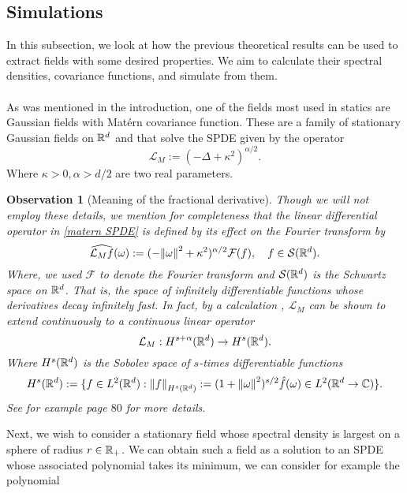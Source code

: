 \documentclass[12pt]{article}
\newtheorem{observation}{Observation}
\begin{document}
\subsection{Simulations}\label{simulations section}
In this subsection, we look at how the previous theoretical results can be used to extract fields with some desired properties. We aim to calculate their spectral densities, covariance functions, and simulate from them.\\
\\
As was mentioned in the introduction, one of the fields most used in statics are Gaussian fields with Matérn covariance function. These are a family of stationary Gaussian fields on ${\mathbb R}^d$ and that solve the SPDE given by the operator
\begin{equation}\label{matern SPDE}
	\mathcal{L}_M:=(-\Delta+\kappa^2)^{\alpha/2}.
\end{equation}
Where $\kappa>0,\alpha>d/2$ are two real parameters.
\begin{observation}[Meaning of the fractional derivative]
	Though we will not employ these details, we mention for completeness that the linear differential operator in \eqref{matern SPDE} is defined by its effect on the Fourier transform by
	\begin{equation*}
		\widehat{\mathcal{L}_Mf}(\omega):=(-\norm{\omega}^2+\kappa^2)^{\alpha/2}\mathcal{F}({f}),\quad f\in\mathcal{S}({\mathbb R}^d).
	\end{equation*}
	Where, we used $\mathcal{F}$ to denote the Fourier transform and $\mathcal{S}({\mathbb R}^d)$ is the Schwartz space on ${\mathbb R}^d$. That is, the space of infinitely differentiable functions whose derivatives decay infinitely fast. In fact, by a calculation , $\mathcal{L}_M$ can be shown to extend continuously to a continuous linear operator
	\begin{equation*}
		\mathcal{L}_M: H^{s+\alpha}({\mathbb R}^d)\to H^s({\mathbb R}^d).
	\end{equation*}
	Where $H^s({\mathbb R}^d)$ is the Sobolev space of $s$-times differentiable functions
	\begin{equation*}
		H^s({\mathbb R}^d):=\lbrace f\in L^2({\mathbb R}^d):\norm{f}_{ H^s({\mathbb R}^d)}:= (1+\norm{\omega}^2)^{s/2}\hat{f}(\omega)\in L^2({\mathbb R}^d\to\mathbb{C})\rbrace.
	\end{equation*}
	See for example \cite{lototsky2017stochastic} page $80$ for more details.
\end{observation}
Next, we wish to consider a stationary field whose spectral density is largest on a sphere of radius $r\in {\mathbb R}_+$. We can obtain such a field as a solution to an SPDE whose associated polynomial takes its minimum, we can consider for example the polynomial
\end{document}
